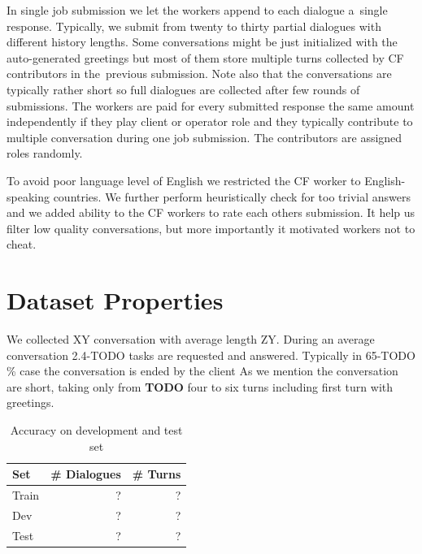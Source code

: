 \documentclass[runningheads,a4paper]{llncs}
\begin{document}
In single job submission we let the workers append to each dialogue a~single response.
Typically, we submit from twenty to thirty partial dialogues with different history lengths.
Some conversations might be just initialized with the auto-generated greetings but most of them store multiple turns collected by CF contributors in the~previous submission.
Note also that the conversations are typically rather short so full dialogues are collected after few rounds of submissions.
The workers are paid for every submitted response the same amount independently if they play client or operator role and they typically contribute to multiple conversation during one job submission.
The contributors are assigned roles randomly.

To avoid poor language level of English we restricted the CF worker to English-speaking countries.
We further perform heuristically check for too trivial answers and we added ability to the CF workers to rate each others submission.
It help us filter low quality conversations, but more importantly it motivated workers not to cheat.





\section{Dataset Properties}
\label{sec:props}

We collected XY conversation with average length ZY.
During an average conversation 2.4-TODO tasks are requested and answered.
Typically in 65-TODO \% case the conversation is ended by the client
As we mention the conversation are short, taking only from {\bf TODO} four to six turns including first turn with greetings.
\begin{table}
\begin{center}
\begin{tabular}{lrr}
\hline
Set   & \# Dialogues & \# Turns \\
\hline
Train  &   ? & ? \\
Dev &   ? & ? \\
Test &   ? & ? \\
\hline
\end{tabular}
\caption{Accuracy on development and test set}
\vspace{-2em}
\end{center}
\label{tab:props}
\end{table}
\end{document}

